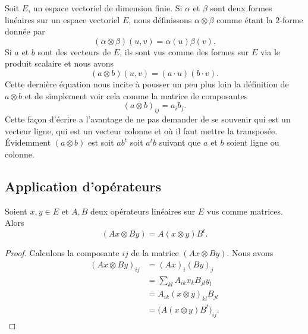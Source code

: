 Soit \( E\), un espace vectoriel de dimension finie. Si \( \alpha\) et \( \beta\) sont deux formes linéaires sur un espace vectoriel \( E\), nous définissons \( \alpha\otimes \beta\) comme étant la \( 2\)-forme donnée par
\begin{equation}        \label{EQooUNRYooKBrXyK}
	(\alpha\otimes \beta)(u,v)=\alpha(u)\beta(v).
\end{equation}
Si \( a\) et \( b\) sont des vecteurs de \( E\), ils sont vus comme des formes sur \( E\) via le produit scalaire et nous avons
\begin{equation}
	(a\otimes b)(u,v)=(a\cdot u)(b\cdot v).
\end{equation}
Cette dernière équation nous incite à pousser un peu plus loin la définition de \( a\otimes b\) et de simplement voir cela comme la matrice de composantes
\begin{equation}
	(a\otimes b)_{ij}=a_ib_j.
\end{equation}
Cette façon d'écrire a l'avantage de ne pas demander de se souvenir qui est un vecteur ligne, qui est un vecteur colonne et où il faut mettre la transposée. Évidemment \( (a\otimes b)\) est soit \( ab^t\) soit \( a^tb\) suivant que \( a\) et \( b\) soient ligne ou colonne.

\subsection{Application d'opérateurs}

\begin{lemma}   \label{LemMyKPzY}
	Soient \( x,y\in E\) et \( A,B\) deux opérateurs linéaires sur \( E\) vus comme matrices. Alors
	\begin{equation}        \label{EqXdxvSu}
		(Ax\otimes By)=A(x\otimes y)B^t.
	\end{equation}
\end{lemma}

\begin{proof}
	Calculons la composante \( ij\) de la matrice \( (Ax\otimes By)\). Nous avons
	\begin{subequations}
		\begin{align}
			(Ax\otimes By)_{ij} & =(Ax)_i(By)_j                       \\
			                    & =\sum_{kl}A_{ik}x_kB_{jl}y_l        \\
			                    & =A_{ik}(x\otimes y)_{kl}B_{jl}      \\
			                    & =\big( A(x\otimes y)B^t \big)_{ij}.
		\end{align}
	\end{subequations}
\end{proof}


